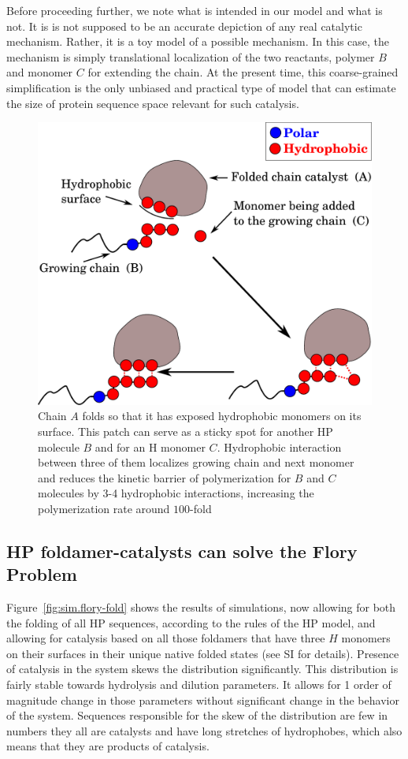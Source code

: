 \documentclass[journal=jacsat,manuscript=article,layout=twocolumn]{achemso}
\begin{document}
Before proceeding further, we note what is intended in our model and what is not.  It is is not 
supposed to be an accurate depiction of any real catalytic mechanism.  Rather, it is a toy 
model of a possible mechanism.  In this case, the mechanism is simply translational 
localization of the two reactants, polymer $B$ and monomer $C$ for extending the chain.  At the 
present time, this coarse-grained simplification is the only unbiased and practical type of model 
that can estimate the size of protein sequence space relevant for such catalysis.
\begin{figure}[h!]
  \centering
  \includegraphics[width=0.9\columnwidth]{pictures/hp-catalysis.pdf} 
  \caption{Chain $A$ folds so that it has exposed hydrophobic monomers on its surface.  This patch 
can serve as a sticky spot for another HP molecule $B$ and for an H monomer $C$.  Hydrophobic 
interaction between three of them localizes growing chain and next monomer and reduces the kinetic 
barrier of polymerization for $B$ and $C$ molecules by 3-4 hydrophobic interactions, increasing the 
polymerization rate around $ 100$-fold }
  \label{fig:hp-catalysis}
\end{figure}


\subsection{HP foldamer-catalysts can solve the Flory Problem}

Figure~\ref{fig:sim.flory-fold} shows the results of simulations, now allowing for both the 
folding of all HP sequences, according to the rules of the HP model, and allowing for catalysis 
based on all those foldamers that have three $H$ monomers on their surfaces in their unique native 
folded states (see SI for details). Presence of catalysis in the system skews the distribution 
significantly. This distribution is fairly stable towards hydrolysis and dilution
parameters. It allows for 1 order of magnitude change in those parameters without significant change 
in the behavior of the system. Sequences responsible for the skew of the distribution are few 
in numbers they all are catalysts and have long stretches of hydrophobes, which also means that they 
are products of catalysis. 
\end{document}
